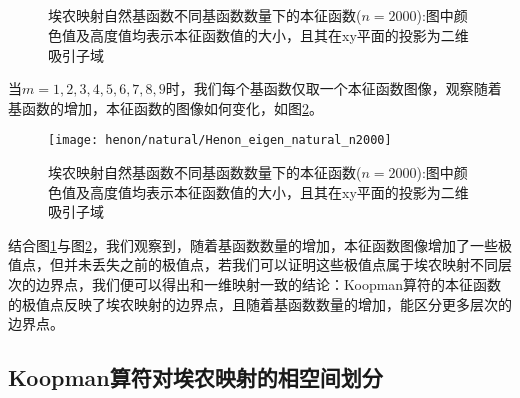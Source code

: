 \begin{figure}
    \centering
    \\
    \\
    \\
    \\
    \caption[埃农映射自然基函数不同基函数数量下的本征函数]{埃农映射自然基函数不同基函数数量下的本征函数($n=2000$):图中颜色值及高度值均表示本征函数值的大小，且其在xy平面的投影为二维吸引子域}\label{fig:Henon_eigen_natural_n2000m1}
\end{figure}

当$m=1,2,3,4,5,6,7,8,9$时，我们每个基函数仅取一个本征函数图像，观察随着基函数的增加，本征函数的图像如何变化，如图\ref{fig:Henon_eigen_natural_n2000}。

\begin{figure}
	\centering
	\texttt{[image: henon/natural/Henon\_eigen\_natural\_n2000]}
    \caption{埃农映射自然基函数不同基函数数量下的本征函数($n=2000$):图中颜色值及高度值均表示本征函数值的大小，且其在xy平面的投影为二维吸引子域}\label{fig:Henon_eigen_natural_n2000}
\end{figure}

结合图\ref{fig:Henon_eigen_natural_n2000m1}与图\ref{fig:Henon_eigen_natural_n2000}，我们观察到，随着基函数数量的增加，本征函数图像增加了一些极值点，但并未丢失之前的极值点，若我们可以证明这些极值点属于埃农映射不同层次的边界点，我们便可以得出和一维映射一致的结论：Koopman算符的本征函数的极值点反映了埃农映射的边界点，且随着基函数数量的增加，能区分更多层次的边界点。

\subsection{Koopman算符对埃农映射的相空间划分}

